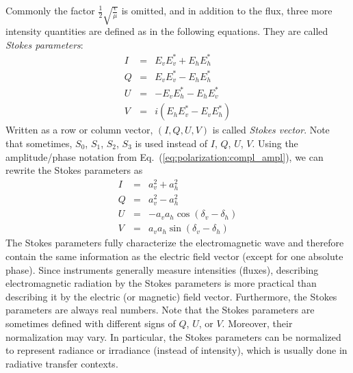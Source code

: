 Commonly the factor  $\frac{1}{2}\sqrt{\frac{\epsilon}{\mu}}$ is
omitted, and in addition to the flux, three more intensity quantities
are defined as in the following equations. They are called 
\emph{Stokes parameters}:
\begin{eqnarray}
  \label{eq:polarization:stokesparam_I}
  I &=&   E_v E_v^\ast + E_h E_h^\ast \\
  \label{eq:polarization:stokesparam_Q}
  Q &=&   E_v E_v^\ast - E_h E_h^\ast \\
  \label{eq:polarization:stokesparam_U}
  U &=& - E_v E_h^\ast - E_h E_v^\ast \\
  \label{eq:polarization:stokesparam_V}
  V &=& i(E_h E_v^\ast - E_v E_h^\ast)
\end{eqnarray}
Written as a row or column vector, $(I,Q,U,V)$ is called
\emph{Stokes vector}. Note that sometimes, $S_0$, $S_1$, $S_2$, $S_3$
is used instead of $I$, $Q$, $U$, $V$.
Using the amplitude/phase notation from
Eq.~(\ref{eq:polarization:compl_ampl}),
we can rewrite the Stokes parameters as 
\begin{eqnarray}
  \label{eq:polarization:stokesparam_alt_I}
 I &=& a_v^2 + a_h^2\\
  \label{eq:polarization:stokesparam_alt_Q}
 Q &=& a_v^2 - a_h^2\\
  \label{eq:polarization:stokesparam_alt_U}
 U &=&  - a_v a_h \cos(\delta_v-\delta_h)\\
  \label{eq:polarization:stokesparam_alt_V}
 V &=&   a_v a_h \sin(\delta_v-\delta_h)
\end{eqnarray}
The Stokes parameters fully characterize the electromagnetic wave and
therefore contain the same information as the electric field vector
(except for one absolute phase).  Since instruments generally measure
intensities (fluxes), describing electromagnetic radiation by the
Stokes parameters is more practical than describing it by the electric
(or magnetic) field vector. Furthermore, the Stokes parameters are
always real numbers.
Note that the Stokes parameters are sometimes defined with different
signs of $Q$, $U$, or $V$. Moreover, their normalization may vary. In
particular, the Stokes parameters can be normalized to represent
radiance or irradiance (instead of intensity), which is usually done
in radiative transfer contexts.
 

